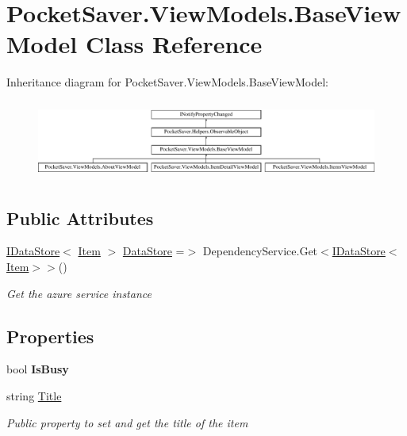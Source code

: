 \hypertarget{class_pocket_saver_1_1_view_models_1_1_base_view_model}{}\section{Pocket\+Saver.\+View\+Models.\+Base\+View\+Model Class Reference}
\label{class_pocket_saver_1_1_view_models_1_1_base_view_model}
Inheritance diagram for Pocket\+Saver.\+View\+Models.\+Base\+View\+Model\+:\begin{figure}[H]
\begin{center}
\leavevmode
\includegraphics[height=2.610723cm]{class_pocket_saver_1_1_view_models_1_1_base_view_model}
\end{center}
\end{figure}
\subsection*{Public Attributes}
\begin{DoxyCompactItemize}
\item 
\hyperlink{interface_pocket_saver_1_1_services_1_1_i_data_store}{I\+Data\+Store}$<$ \hyperlink{class_pocket_saver_1_1_models_1_1_item}{Item} $>$ \hyperlink{class_pocket_saver_1_1_view_models_1_1_base_view_model_aa9bdaa0ab23edb66ede005d03cb871f8}{Data\+Store} =$>$ Dependency\+Service.\+Get$<$\hyperlink{interface_pocket_saver_1_1_services_1_1_i_data_store}{I\+Data\+Store}$<$\hyperlink{class_pocket_saver_1_1_models_1_1_item}{Item}$>$$>$()
\begin{DoxyCompactList}\small\item\em Get the azure service instance \end{DoxyCompactList}\end{DoxyCompactItemize}
\subsection*{Properties}
\begin{DoxyCompactItemize}
\item 
\mbox{\label{class_pocket_saver_1_1_view_models_1_1_base_view_model_a81ff71c4b4b506f92c30ade18f312957}} 
bool {\bfseries Is\+Busy}
\item 
string \hyperlink{class_pocket_saver_1_1_view_models_1_1_base_view_model_a0113530f15cb67f44568bc7ec3c44695}{Title}
\begin{DoxyCompactList}\small\item\em Public property to set and get the title of the item \end{DoxyCompactList}\end{DoxyCompactItemize}
